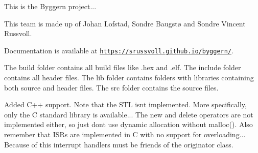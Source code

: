 This is the Byggern project...

This team is made up of Johan Lofstad, Sondre Baugstø and Sondre Vincent Russvoll. 



Documentation is available at \href{https://srussvoll.github.io/byggern/}{\tt https\+://srussvoll.\+github.\+io/byggern/}. 



The \textquotesingle{}build\textquotesingle{} folder contains all build files like .hex and .elf. The \textquotesingle{}include\textquotesingle{} folder contains all header files. The \textquotesingle{}lib\textquotesingle{} folder contains folders with libraries containing both source and header files. The \textquotesingle{}src\textquotesingle{} folder contains the source files. 



Added C++ support. Note that the S\+TL isn\textquotesingle{}t implemented. More specifically, only the C standard library is available... The new and delete operators are not implemented either, so just don\textquotesingle{}t use dynamic allocation without malloc(). Also remember that I\+S\+Rs are implemented in C with no support for overloading... Because of this interrupt handlers must be friends of the originator class. 